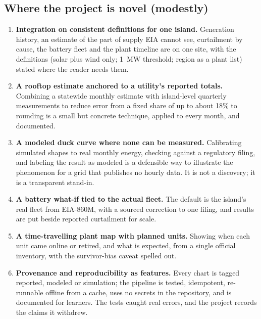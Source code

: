 \documentclass[11pt,a4paper]{article}
\begin{document}
\subsection{Where the project is novel (modestly)}
\begin{enumerate}
\item \textbf{Integration on consistent definitions for one island.} Generation history, an estimate of the part of
 supply EIA cannot see, curtailment by cause, the battery fleet and the plant timeline are on one site, with
 the definitions (solar plus wind only; 1~MW threshold; region as a plant list) stated where the reader needs them.
\item \textbf{A rooftop estimate anchored to a utility's reported totals.} Combining a statewide monthly
 estimate with island-level quarterly measurements to reduce error from a fixed share of up to about 18\% to
 rounding is a small but concrete technique, applied to every month, and documented.
\item \textbf{A modeled duck curve where none can be measured.} Calibrating simulated shapes to real monthly
 energy, checking against a regulatory filing, and labeling the result as modeled is a defensible way to
 illustrate the phenomenon for a grid that publishes no hourly data. It is not a discovery; it is a transparent
 stand-in.
\item \textbf{A battery what-if tied to the actual fleet.} The default is the island's real fleet from EIA-860M, with a
 sourced correction to one filing, and results are put beside reported curtailment for scale.
\item \textbf{A time-travelling plant map with planned units.} Showing when each unit came online or retired, and
 what is expected, from a single official inventory, with the survivor-bias caveat spelled out.
\item \textbf{Provenance and reproducibility as features.} Every chart is tagged reported, modeled or simulation;
 the pipeline is tested, idempotent, re-runnable offline from a cache, uses no secrets in the repository, and is
 documented for learners. The tests caught real errors, and the project records the claims it withdrew.
\end{enumerate}
\end{document}
